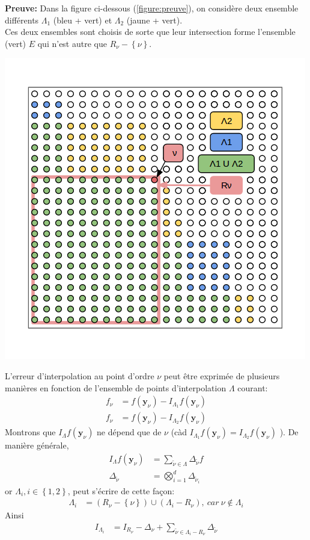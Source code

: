 \textbf{Preuve:} Dans la figure ci-dessous (\ref{figure:preuve}), on considère deux ensemble différents $\Lambda_1$ (bleu + vert) et $\Lambda_2$ (jaune + vert). \\
Ces deux ensembles sont choisis de sorte que leur intersection forme l'ensemble (vert) $E$ qui n'est autre que $R_{\nu} - \left \{ \nu \right \}$.
\begin{center}
\includegraphics[height= 7 cm,width = 0.5\linewidth]{images/preuve.png}
\label{figure:preuve}
\end{center}
L'erreur d'interpolation au point d'ordre $\nu$ peut être exprimée de plusieurs manières en fonction de l'ensemble de points d'interpolation $\Lambda$ courant:
\begin{align}
		f_{\nu} &= f(\textbf{y}_{\nu}) - I_{\Lambda_1} f(\textbf{y}_{\nu}) \nonumber \\
		f_{\nu} &= f(\textbf{y}_{\nu}) - I_{\Lambda_2} f(\textbf{y}_{\nu}) \nonumber
\end{align}
Montrons que $I_{\Lambda} f(\textbf{y}_{\nu})$ ne dépend que de $\nu$ (càd $I_{\Lambda_1} f(\textbf{y}_{\nu})=I_{\Lambda_2} f(\textbf{y}_{\nu})$ ).
De manière générale,
\begin{align}
	  I_{\Lambda} f(\textbf{y}_{\nu}) &= \sum_{\tilde{\nu}\in \Lambda} \Delta_{\tilde{\nu}} f \nonumber \\
		\Delta_{\tilde{\nu}} &= \bigotimes_{i=1}^d \Delta_{\tilde{\nu}_i} \nonumber
\end{align}
or $\Lambda_i, i \in \left \{ 1,2 \right \}$, peut s'écrire de cette façon:
\begin{align}
		\Lambda_i &= (R_{\nu} - \left \{ \nu \right \}) \cup (\Lambda_i - R_{\nu}),\ car\ \nu \notin \Lambda_i \nonumber
\end{align}
Ainsi
\begin{align}
		I_{\Lambda_i} &= I_{R_{\nu}} - \Delta_{\nu} + \sum_{\tilde{\nu}\in \Lambda_i-R_{\nu}} \Delta_{\tilde{\nu}} \nonumber
\end{align}
